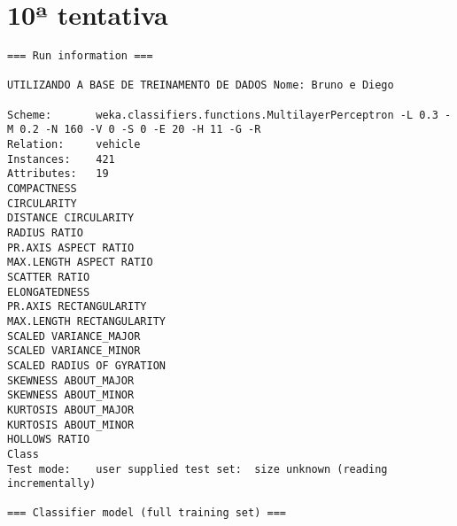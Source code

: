 \documentclass[
	article,			%
	11pt,				%
	oneside,			%
	a4paper,			%
	english,			%
	brazil,				%
	sumario=tradicional
	]{abntex2}
\begin{document}
\section{10ª tentativa}

\begin{lstlisting}
=== Run information ===

UTILIZANDO A BASE DE TREINAMENTO DE DADOS Nome: Bruno e Diego

Scheme:       weka.classifiers.functions.MultilayerPerceptron -L 0.3 -M 0.2 -N 160 -V 0 -S 0 -E 20 -H 11 -G -R
Relation:     vehicle
Instances:    421
Attributes:   19
COMPACTNESS
CIRCULARITY
DISTANCE CIRCULARITY
RADIUS RATIO
PR.AXIS ASPECT RATIO
MAX.LENGTH ASPECT RATIO
SCATTER RATIO
ELONGATEDNESS
PR.AXIS RECTANGULARITY
MAX.LENGTH RECTANGULARITY
SCALED VARIANCE_MAJOR
SCALED VARIANCE_MINOR
SCALED RADIUS OF GYRATION
SKEWNESS ABOUT_MAJOR
SKEWNESS ABOUT_MINOR
KURTOSIS ABOUT_MAJOR
KURTOSIS ABOUT_MINOR
HOLLOWS RATIO
Class
Test mode:    user supplied test set:  size unknown (reading incrementally)

=== Classifier model (full training set) ===


\end{lstlisting}
\end{document}
